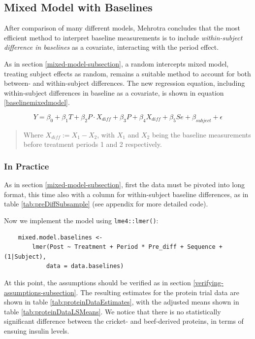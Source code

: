 \documentclass[12pt, TexShade, letterpaper]{report}
\begin{document}
\subsection{Mixed Model with Baselines}
After comparison of many different models, Mehrotra \cite{mehrotra2014} concludes that the most efficient method to interpret baseline measurements is to include \textit{within-subject difference in baselines} as a covariate, interacting with the period effect.

As in section \ref{mixed-model-subsection}, a random intercepts mixed model, treating subject effects as random, remains a suitable method to account for both between- and within-subject differences. The new regression equation, including within-subject differences in baseline as a covariate, is shown in equation \ref{baselinemixedmodel}.

\begin{equation}
    Y = \beta_0 + \beta_1 T + \beta_2 P \cdot X_{diff} + \beta_3 P +
    \beta_4 X_{diff} + \beta_5 Se + \beta_{subject} + \epsilon
    \label{baselinemixedmodel}
\end{equation}
\begin{quote}
    Where $X_{diff} := X_1 - X_2$, with $X_1$ and $X_2$ being the baseline measurements before treatment periods 1 and 2 respectively.
\end{quote}

\subsubsection{In Practice}
As in section \ref{mixed-model-subsection}, first the data must be pivoted into long format, this time also with a column for within-subject baseline differences, as in table \ref{tab:preDiffSubsample} (see appendix for more detailed code).


Now we implement the model using \texttt{lme4::lmer()}:
\begin{verbatim}
    mixed.model.baselines <-
        lmer(Post ~ Treatment + Period * Pre_diff + Sequence + (1|Subject),
            data = data.baselines)
\end{verbatim}
At this point, the assumptions should be verified as in section \ref{verifying-assumptions-subsection}. The resulting estimates for the protein trial data are shown in table \ref{tab:proteinDataEstimates}, with the adjusted means shown in table \ref{tab:proteinDataLSMeans}. We notice that there is no statistically significant difference between the cricket- and beef-derived proteins, in terms of ensuing insulin levels.



	{
	
	
	
	
	}
	
\end{document}
